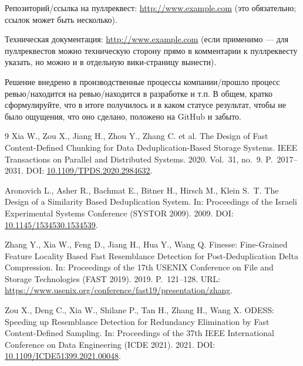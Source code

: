 \documentclass[a4paper]{article}
\begin{document}
Репозиторий/ссылка на пуллреквест: \url{http://www.example.com} (это обязательно; ссылок может быть несколько).

Техническая документация: \url{http://www.example.com} (если применимо --- для пуллреквестов можно техническую сторону прямо в комментарии к пуллреквесту указать, но можно и в отдельную вики-страницу вынести).

Решение внедрено в производственные процессы компании/прошло процесс ревью/находится на ревью/находится в разработке и т.п. В общем, кратко сформулируйте, что в итоге получилось и в каком статусе результат, чтобы не было ощущения, что оно сделано, положено на GitHub и забыто.

\begin{thebibliography}{9}
    Xia W., Zou X., Jiang H., Zhou Y., Zhang C. et al.
    \newblock The Design of Fast Content-Defined Chunking for Data Deduplication-Based Storage Systems.
    \newblock IEEE Transactions on Parallel and Distributed Systems. 2020. Vol.~31, no.~9. P.~2017--2031.
    \newblock DOI: \href{https://doi.org/10.1109/TPDS.2020.2984632}{10.1109/TPDS.2020.2984632}.

    Aronovich L., Asher R., Bachmat E., Bitner H., Hirsch M., Klein S.~T.
    \newblock The Design of a Similarity Based Deduplication System.
    \newblock In: Proceedings of the Israeli Experimental Systems Conference (SYSTOR 2009). 2009.
    \newblock DOI: \href{https://doi.org/10.1145/1534530.1534539}{10.1145/1534530.1534539}.

    Zhang Y., Xia W., Feng D., Jiang H., Hua Y., Wang Q.
    \newblock Finesse: Fine-Grained Feature Locality Based Fast Resemblance Detection for Post-Deduplication Delta Compression.
    \newblock In: Proceedings of the 17th USENIX Conference on File and Storage Technologies (FAST 2019). 2019. P.~121--128.
    \newblock URL: \url{https://www.usenix.org/conference/fast19/presentation/zhang}.

    Zou X., Deng C., Xia W., Shilane P., Tan H., Zhang H., Wang X.
    \newblock ODESS: Speeding up Resemblance Detection for Redundancy Elimination by Fast Content-Defined Sampling.
    \newblock In: Proceedings of the 37th IEEE International Conference on Data Engineering (ICDE 2021). 2021.
    \newblock DOI: \href{https://doi.org/10.1109/ICDE51399.2021.00048}{10.1109/ICDE51399.2021.00048}.
\end{thebibliography}
\end{document}
